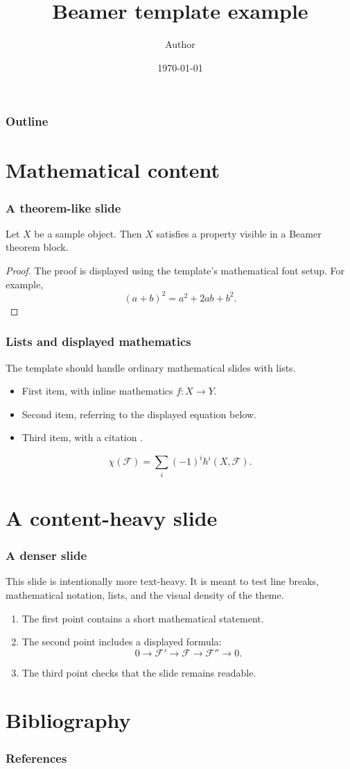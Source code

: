 \documentclass[12pt]{beamer}
\title[Beamer template example]{Beamer template example}
\author{Author}
\institute{Institution}
\date{\today}
\begin{document}
\frame{\titlepage}

\begin{frame}
\frametitle{Outline}
\tableofcontents
\end{frame}

\section{Mathematical content}

\begin{frame}
\frametitle{A theorem-like slide}

\begin{theorem}
Let \(X\) be a sample object. Then \(X\) satisfies a property visible in a
Beamer theorem block.
\end{theorem}

\begin{proof}
The proof is displayed using the template's mathematical font setup. For
example,
\[
  (a+b)^2 = a^2 + 2ab + b^2.
\]
\end{proof}
\end{frame}

\begin{frame}
\frametitle{Lists and displayed mathematics}

The template should handle ordinary mathematical slides with lists.

\begin{itemize}
  \item First item, with inline mathematics \(f \colon X \to Y\).
  \item Second item, referring to the displayed equation below.
  \item Third item, with a citation \cite{har77}.
\end{itemize}

\[
  \chi(\mathscr{F}) =
  \sum_i (-1)^i h^i(X,\mathscr{F}).
\]
\end{frame}

\section{A content-heavy slide}

\begin{frame}
\frametitle{A denser slide}

This slide is intentionally more text-heavy. It is meant to test line breaks,
mathematical notation, lists, and the visual density of the theme.

\begin{enumerate}
  \item The first point contains a short mathematical statement.
  \item The second point includes a displayed formula:
  \[
    0 \to \mathscr{F}' \to \mathscr{F} \to \mathscr{F}'' \to 0.
  \]
  \item The third point checks that the slide remains readable.
\end{enumerate}
\end{frame}

\section{Bibliography}

\begin{frame}[allowframebreaks]
\frametitle{References}
\printbibliography
\end{frame}
\end{document}
